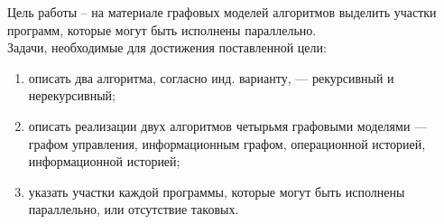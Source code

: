 
Цель работы -- на материале графовых моделей алгоритмов выделить участки программ, которые могут быть исполнены параллельно.\\

Задачи, необходимые для достижения поставленной цели:
\begin{enumerate}
	\item описать два алгоритма, согласно инд. варианту, --- рекурсивный и нерекурсивный;
	\item описать реализации двух алгоритмов четырьмя графовыми моделями --- графом управления, информационным графом, операционной историей, информационной историей;
	\item указать участки каждой программы, которые могут быть исполнены параллельно, или отсутствие таковых.
\end{enumerate}

\clearpage
